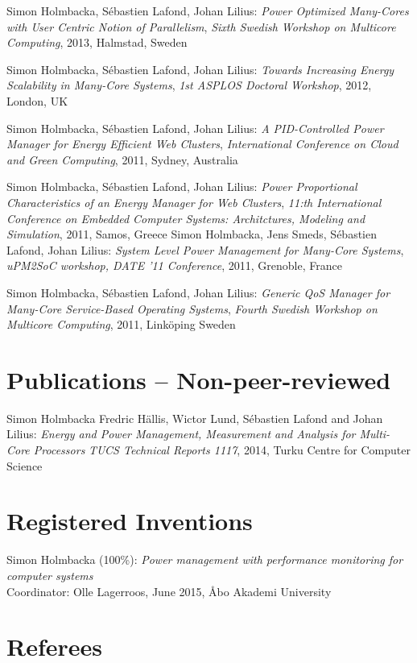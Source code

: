 \documentclass[margin,line]{resume}
\begin{document}
\begin{resume}
Simon Holmbacka, S\'{e}bastien Lafond, Johan Lilius: 
\textit{Power Optimized Many-Cores with User Centric Notion of Parallelism},
\textsl{Sixth Swedish Workshop on Multicore Computing}, 2013, Halmstad, Sweden
  
Simon Holmbacka, S\'{e}bastien Lafond, Johan Lilius: 
\textit{Towards Increasing Energy Scalability in Many-Core Systems}, 
\textsl{1st ASPLOS Doctoral Workshop}, 2012, London, UK

Simon Holmbacka, S\'{e}bastien Lafond, Johan Lilius: 
\textit{A PID-Controlled Power Manager for Energy Efficient Web Clusters}, 
\textsl{International Conference on Cloud and Green Computing}, 2011, Sydney, Australia 

Simon Holmbacka, S\'{e}bastien Lafond, Johan Lilius: 
\textit{Power Proportional Characteristics of an Energy Manager for Web Clusters}, 
\textsl{11:th International Conference on Embedded Computer Systems: Architctures, Modeling and Simulation}, 2011, Samos, Greece
\clearpage
Simon Holmbacka, Jens Smeds, S\'{e}bastien Lafond, Johan Lilius:
\textit{System Level Power Management for Many-Core Systems},
\textsl{uPM2SoC workshop, DATE '11 Conference}, 2011, Grenoble, France

Simon Holmbacka, S\'{e}bastien Lafond, Johan Lilius: 
\textit{Generic QoS Manager for Many-Core Service-Based Operating Systems}, 
\textsl{Fourth Swedish Workshop on Multicore Computing}, 2011, Link\"{o}ping Sweden

\section{\mysidestyle Publications -- Non-peer-reviewed}
Simon Holmbacka Fredric H\"{a}llis, Wictor Lund, S\'{e}bastien Lafond and Johan Lilius:
\textit{Energy and Power Management, Measurement and Analysis for Multi-Core Processors} 
\textsl{TUCS Technical Reports 1117}, 2014, Turku Centre for Computer Science 

\section{\mysidestyle Registered Inventions}
Simon Holmbacka (100\%):
\textit{Power management with performance monitoring for computer systems}\\Coordinator: Olle Lagerroos, June 2015, \AA{}bo Akademi University
\section{\mysidestyle Referees} 


\end{resume}
\end{document}
